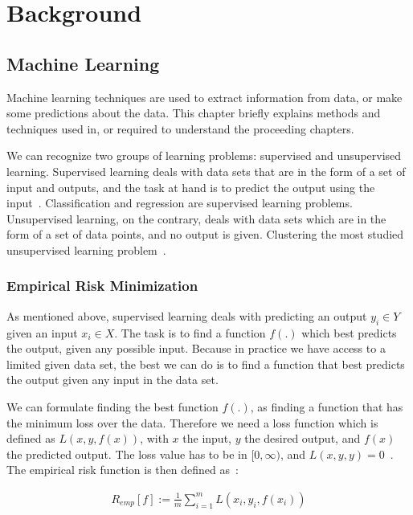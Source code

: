 \chapter{Background}

\section{Machine Learning}
Machine learning techniques are used to extract information from data, or make some predictions about the data. This chapter briefly explains methods and techniques used in, or required to understand the proceeding chapters.

We can recognize two groups of learning problems: supervised and unsupervised learning. Supervised learning deals with data sets that are in the form of a set of input and outputs, and the task at hand is to predict the output using the input~\cite[TODO: chapter]{statistical-learning}. Classification and regression are supervised learning problems. Unsupervised learning, on the contrary, deals with data sets which are in the form of a set of data points, and no output is given. Clustering the most studied unsupervised learning problem~\cite[TODO: chapter]{statistical-learning}.

\subsection{Empirical Risk Minimization}
\label{chap:empirical-risk-minimization}
As mentioned above, supervised learning deals with predicting an output $y_i \in Y$ given an input $x_i \in X$. The task is to find a function $f(.)$ which best predicts the output, given any possible input. Because in practice we have access to a limited given data set, the best we can do is to find a function that best predicts the output given any input in the data set.

We can formulate finding the best function $f(.)$, as finding a function that has the minimum loss over the data. Therefore we need a loss function which is defined as $L(x, y, f(x))$, with $x$ the input, $y$ the desired output, and $f(x)$ the predicted output. The loss value has to be in $[0, \infty)$, and $L(x, y, y) = 0$~\cite[p. 62]{learning-with-kernels}. The empirical risk function is then defined as~\cite[p. 67]{learning-with-kernels}:

  \begin{align}
    R_{emp}[f] := \frac{1}{m}\sum_{i = 1}^{m} L(x_i, y_i, f(x_i))
  \end{align}
  
